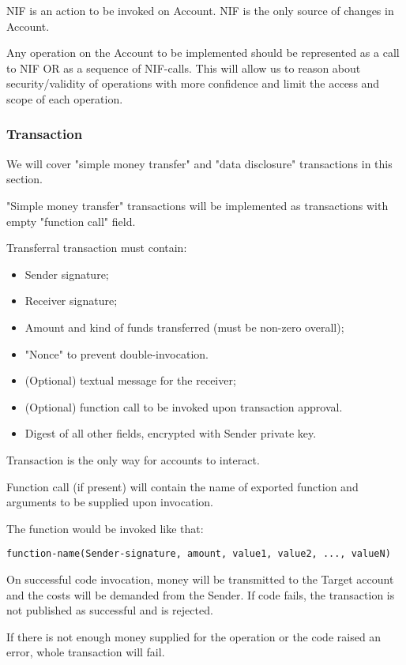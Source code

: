 NIF is an action to be invoked on Account.
NIF is the only source of changes in Account.

Any operation on the Account to be implemented should be represented as a call to NIF OR as a sequence of NIF-calls.
This will allow us to reason about security/validity of operations with more confidence and limit the access and scope of each operation.

\subsubsection{Transaction}

We will cover "simple money transfer" and "data disclosure" transactions in this section.

"Simple money transfer" transactions will be implemented as transactions with empty "function call" field.

Transferral transaction must contain:
\begin{itemize}
  \item Sender signature;
  \item Receiver signature;
  \item Amount and kind of funds transferred (must be non-zero overall);
  \item "Nonce" to prevent double-invocation.
  \item (Optional) textual message for the receiver;
  \item (Optional) function call to be invoked upon transaction approval.
  \item Digest of all other fields, encrypted with Sender private key.
\end{itemize}

Transaction is the only way for accounts to interact.

Function call (if present) will contain the name of exported function and arguments to be supplied upon invocation.

The function would be invoked like that:

\begin{verbatim}
function-name(Sender-signature, amount, value1, value2, ..., valueN)
\end{verbatim}

On successful code invocation, money will be transmitted to the Target account and the costs will be demanded from the Sender.
If code fails, the transaction is not published as successful and is rejected.

If there is not enough money supplied for the operation or the code raised an error, whole transaction will fail.

